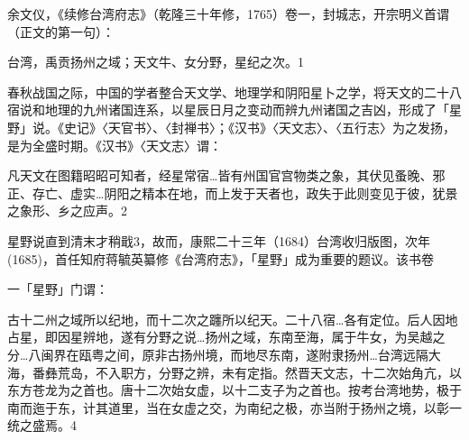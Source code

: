 
余文仪，《续修台湾府志》（乾隆三十年修，1765）卷一，封城志，开宗明义首谓（正文的第一句）：

\begin{BookQuote}
台湾，禹贡扬州之域；天文牛、女分野，星纪之次。1
\end{BookQuote}

春秋战国之际，中国的学者整合天文学、地理学和阴阳星卜之学，将天文的二十八宿说和地理的九州诸国连系，以星辰日月之变动而辨九州诸国之吉凶，形成了「星野」说。《史记》〈天官书〉、〈封禅书〉；《汉书》〈天文志〉、〈五行志〉为之发扬，是为全盛时期。《汉书》〈天文志〉谓：

\begin{BookQuote}
凡天文在图籍昭昭可知者，经星常宿…皆有州国官宫物类之象，其伏见蚤晚、邪正、存亡、虚实…阴阳之精本在地，而上发于天者也，政失于此则变见于彼，犹景之象形、乡之应声。2
\end{BookQuote}

星野说直到清末才稍戢3，故而，康熙二十三年（1684）台湾收归版图，次年(1685)，首任知府蒋毓英纂修《台湾府志》，「星野」成为重要的题议。该书卷

\vfill
\begin{BookNotes}
\end{BookNotes}

\noindent 一「星野」门谓：

古十二州之域所以纪地，而十二次之躔所以纪天。二十八宿…各有定位。后人因地占星，即因星辨地，遂有分野之说…扬州之域，东南至海，属于牛女，为吴越之分…八闽界在瓯粤之间，原非古扬州境，而地尽东南，遂附隶扬州…台湾远隔大海，番彝荒岛，不入职方，分野之辨，未有定指。然晋天文志，十二次始角亢，以东方苍龙为之首也。唐十二次始女虚，以十二支子为之首也。按考台湾地势，极于南而迤于东，计其道里，当在女虚之交，为南纪之极，亦当附于扬州之境，以彰一统之盛焉。4

